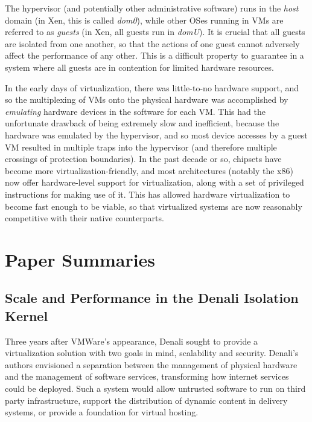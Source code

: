\documentclass[letterpaper, twocolumn]{article}
\begin{document}
The hypervisor (and potentially other administrative software) runs in the \emph{host}
domain (in Xen, this is called \emph{dom0}), while other OSes running in VMs are 
referred to as \emph{guests} (in Xen, all guests run in \emph{domU}).  It is
crucial that all guests are isolated from one another, so that the actions of one guest
cannot adversely affect the performance of any other.  This is a difficult property
to guarantee in a system where all guests are in contention for limited hardware resources.

In the early days of virtualization, there was little-to-no hardware support,
and so the multiplexing of VMs onto the physical hardware was accomplished by
\emph{emulating} hardware devices in the software for each VM.  This had the unfortunate
drawback of being extremely slow and inefficient, because the hardware was emulated by
the hypervisor, and so most device accesses by a guest VM resulted in multiple traps
into the hypervisor (and therefore multiple crossings of protection boundaries).
In the past decade or so, chipsets have become more virtualization-friendly,
and most architectures (notably the x86) now offer hardware-level support for
virtualization, along with a set of privileged instructions for making use of it.
This has allowed hardware virtualization to become fast enough to be viable,
so that virtualized systems are now reasonably competitive with their native
counterparts.

\section{Paper Summaries}
\label{sec:summaries}

\subsection{Scale and Performance in the Denali Isolation Kernel}
\label{sec:summaries/denali}

Three years after VMWare's appearance, Denali \cite{ref:denali} sought to provide a virtualization
solution with two goals in mind, scalability and security. Denali's authors
envisioned a separation between the management of physical hardware and the management
of software services, transforming how internet services could be deployed. Such a system 
would allow untrusted software to run on third party infrastructure, support the distribution 
of dynamic content in delivery systems, or provide a foundation for virtual hosting.
\end{document}
